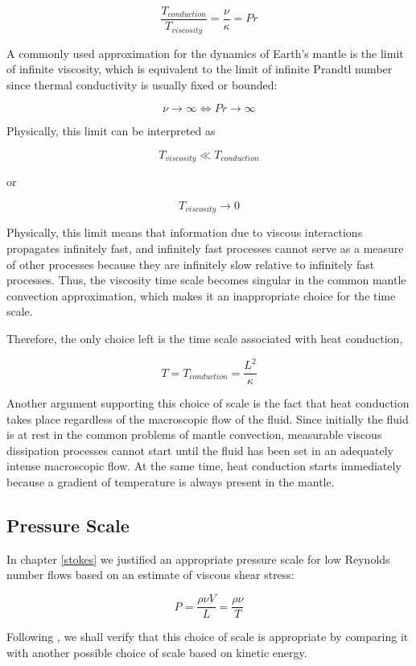 $$ \frac{T_{conduction}}{T_{viscosity}} = \frac{\nu}{\kappa} = Pr $$ 

A commonly used approximation for the dynamics of Earth's mantle is the limit of infinite viscosity, which is equivalent to the limit of infinite Prandtl number since thermal conductivity is usually fixed or bounded:

$$ \nu \longrightarrow \infty \Longleftrightarrow Pr \longrightarrow \infty$$

Physically, this limit can be interpreted as

$$ T_{viscosity} \ll T_{conduction} $$

or 

$$ T_{viscosity} \longrightarrow 0 $$

Physically, this limit means that information due to viscous interactions propagates infinitely fast, and infinitely fast processes cannot serve as a measure of other processes because they are infinitely slow relative to infinitely fast processes. Thus, the viscosity time scale becomes singular in the common mantle convection approximation, which makes it an inappropriate choice for the time scale.

Therefore, the only choice left is the time scale associated with heat conduction,

$$ T = T_{conduction} = \frac{L^2}{\kappa} $$

Another argument supporting this choice of scale is the fact that heat conduction takes place regardless of the macroscopic flow of the fluid. Since initially the fluid is at rest in the common problems of mantle convection, measurable viscous dissipation processes cannot start until the fluid has been set in an adequately intense macroscopic flow. At the same time, heat conduction starts immediately because a gradient of temperature is always present in the mantle.

\subsection{Pressure Scale}

In chapter \ref{stokes} we justified an appropriate pressure scale for low Reynolds number flows based on an estimate of viscous shear stress:

$$ P = \frac{\rho \nu V}{L} = \frac{\rho \nu}{T} $$

Following \cite[pp. 433-434]{leal}, we shall verify that this choice of scale is appropriate by comparing it with another possible choice of scale based on kinetic energy.

